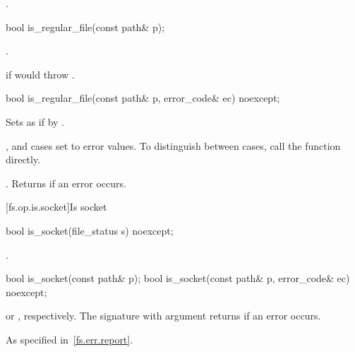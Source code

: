 \begin{itemdescr}
\pnum
\returns
{}.
\end{itemdescr}

%
\begin{itemdecl}
bool is_regular_file(const path& p);
\end{itemdecl}

\begin{itemdescr}
\pnum
\returns
{}.

\pnum
\throws
{} if  would throw .
\end{itemdescr}

%
\begin{itemdecl}
bool is_regular_file(const path& p, error_code& ec) noexcept;
\end{itemdecl}

\begin{itemdescr}
\pnum
\effects
Sets  as if by .
\begin{note}
,  and
   cases set  to error values. To distinguish between cases, call the  function directly.
\end{note}

\pnum
\returns
{}.
Returns  if an error occurs.
\end{itemdescr}


[fs.op.is.socket]{Is socket}

%
\begin{itemdecl}
bool is_socket(file_status s) noexcept;
\end{itemdecl}

\begin{itemdescr}
\pnum
\returns
{}.
\end{itemdescr}

%
\begin{itemdecl}
bool is_socket(const path& p);
bool is_socket(const path& p, error_code& ec) noexcept;
\end{itemdecl}

\begin{itemdescr}
\pnum
\returns
{} or
  , respectively. The signature with argument
   returns  if an error occurs.

\pnum
\throws
As specified in~\ref{fs.err.report}.
\end{itemdescr}


